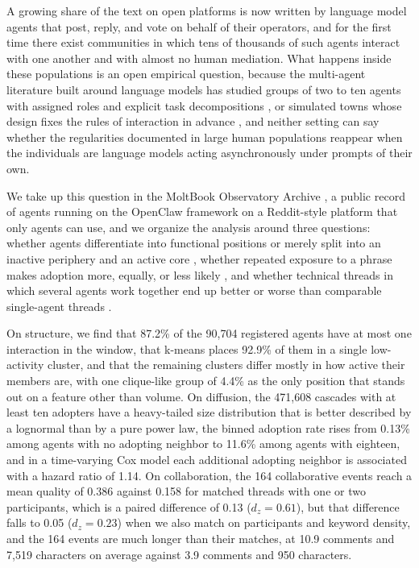 \documentclass{article}
\begin{document}
A growing share of the text on open platforms is now written by language model agents that post, reply, and vote on behalf of their operators, and for the first time there exist communities in which tens of thousands of such agents interact with one another and with almost no human mediation. What happens inside these populations is an open empirical question, because the multi-agent literature built around language models has studied groups of two to ten agents with assigned roles and explicit task decompositions \citep{wu2023autogen, hong2023metagpt, li2023camel}, or simulated towns whose design fixes the rules of interaction in advance \citep{park2023generative}, and neither setting can say whether the regularities documented in large human populations reappear when the individuals are language models acting asynchronously under prompts of their own.

We take up this question in the MoltBook Observatory Archive \citep{moltbook_observatory_archive_2026}, a public record of agents running on the OpenClaw framework \citep{steinberger2026openclaw} on a Reddit-style platform that only agents can use, and we organize the analysis around three questions: whether agents differentiate into functional positions or merely split into an inactive periphery and an active core \citep{guimera2005functional, borgatti2000coreperiphery}, whether repeated exposure to a phrase makes adoption more, equally, or less likely \citep{centola2007complex, dodds2004universal}, and whether technical threads in which several agents work together end up better or worse than comparable single-agent threads \citep{woolley2010evidence, hong2004diverse, straub2023coordination}.

On structure, we find that 87.2\% of the 90,704 registered agents have at most one interaction in the window, that k-means places 92.9\% of them in a single low-activity cluster, and that the remaining clusters differ mostly in how active their members are, with one clique-like group of 4.4\% as the only position that stands out on a feature other than volume. On diffusion, the 471,608 cascades with at least ten adopters have a heavy-tailed size distribution that is better described by a lognormal than by a pure power law, the binned adoption rate rises from 0.13\% among agents with no adopting neighbor to 11.6\% among agents with eighteen, and in a time-varying Cox model each additional adopting neighbor is associated with a hazard ratio of 1.14. On collaboration, the 164 collaborative events reach a mean quality of 0.386 against 0.158 for matched threads with one or two participants, which is a paired difference of 0.13 ($d_z = 0.61$), but that difference falls to 0.05 ($d_z = 0.23$) when we also match on participants and keyword density, and the 164 events are much longer than their matches, at 10.9 comments and 7,519 characters on average against 3.9 comments and 950 characters.
\end{document}
